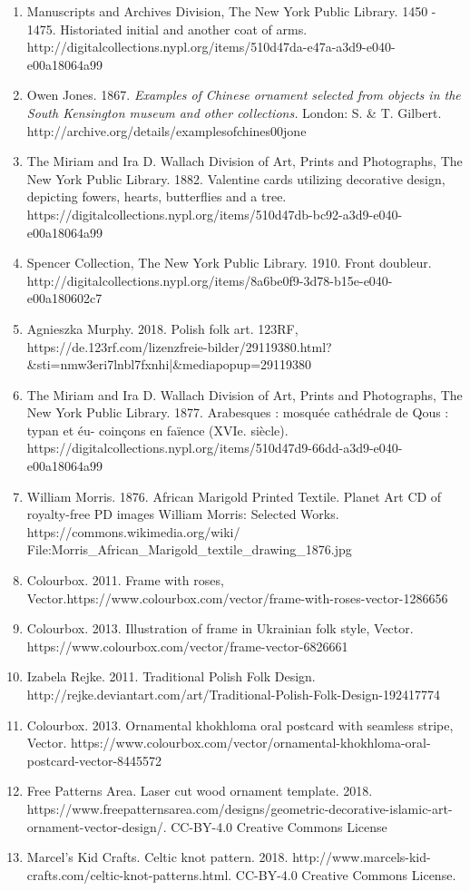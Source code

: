 \begin{enumerate}
    \item{Manuscripts and Archives Division, The New York Public Library. 1450 - 1475. Historiated initial and another coat of arms. http://digitalcollections.nypl.org/items/510d47da-e47a-a3d9-e040-e00a18064a99}
    \item{Owen Jones. 1867. \textit{Examples of Chinese ornament selected from objects in the South Kensington museum and other collections.} London: S. \& T. Gilbert. http://archive.org/details/examplesofchines00jone}
    \item{The Miriam and Ira D. Wallach Division of Art, Prints and Photographs, The New York Public Library. 1882. Valentine cards utilizing decorative design, depicting fowers, hearts, butterflies and a tree. https://digitalcollections.nypl.org/items/510d47db-bc92-a3d9-e040-e00a18064a99}
    \item{Spencer Collection, The New York Public Library. 1910. Front doubleur. http://digitalcollections.nypl.org/items/8a6be0f9-3d78-b15e-e040-e00a180602c7}
    \item {Agnieszka Murphy. 2018. Polish folk art. 123RF, https://de.123rf.com/lizenzfreie-bilder/29119380.html?
    \&sti=nmw3eri7lnbl7fxnhi|\&mediapopup=29119380}
    \item{The Miriam and Ira D. Wallach Division of Art, Prints and Photographs, The New York Public Library. 1877. Arabesques : mosquée cathédrale de Qous : typan et éu- coinçons en faïence (XVIe. siècle). https://digitalcollections.nypl.org/items/510d47d9-66dd-a3d9-e040-e00a18064a99}
    \item{William Morris. 1876. African Marigold Printed Textile. Planet Art CD of royalty-free PD images William Morris: Selected Works. https://commons.wikimedia.org/wiki/
    File:Morris\_African\_Marigold\_textile\_drawing\_1876.jpg}
    \item{Colourbox. 2011. Frame with roses, Vector.\linebreak https://www.colourbox.com/vector/frame-with-roses-vector-1286656}
    \item{Colourbox. 2013. Illustration of frame in Ukrainian folk style, Vector. https://www.colourbox.com/vector/frame-vector-6826661}
    \item{Izabela Rejke. 2011. Traditional Polish Folk Design. http://rejke.deviantart.com/art/Traditional-Polish-Folk-Design-192417774}
    \item{Colourbox. 2013. Ornamental khokhloma oral postcard with seamless stripe, Vector. https://www.colourbox.com/vector/ornamental-khokhloma-oral-postcard-vector-8445572}
    
    \item{Free Patterns Area. Laser cut wood ornament template. 2018. https://www.freepatternsarea.com/designs/geometric-decorative-islamic-art-ornament-vector-design/. CC-BY-4.0 Creative Commons License}
    \item {Marcel's Kid Crafts. Celtic knot pattern. 2018. http://www.marcels-kid-crafts.com/celtic-knot-patterns.html. CC-BY-4.0 Creative Commons License.}
\end{enumerate}

% 